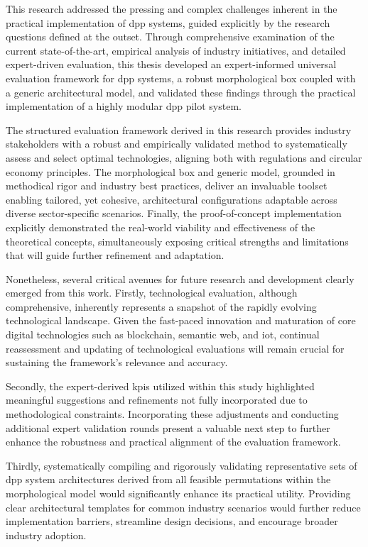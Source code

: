 This research addressed the pressing and complex challenges inherent in the practical implementation of \ac{dpp} systems, guided explicitly by the research questions defined at the outset. Through comprehensive examination of the current state-of-the-art, empirical analysis of industry initiatives, and detailed expert-driven evaluation, this thesis developed an expert-informed universal evaluation framework for \ac{dpp} systems, a robust morphological box coupled with a generic architectural model, and validated these findings through the practical implementation of a highly modular \ac{dpp} pilot system.

The structured evaluation framework derived in this research provides industry stakeholders with a robust and empirically validated method to systematically assess and select optimal technologies, aligning both with regulations and circular economy principles. The morphological box and generic model, grounded in methodical rigor and industry best practices, deliver an invaluable toolset enabling tailored, yet cohesive, architectural configurations adaptable across diverse sector-specific scenarios. Finally, the proof-of-concept implementation explicitly demonstrated the real-world viability and effectiveness of the theoretical concepts, simultaneously exposing critical strengths and limitations that will guide further refinement and adaptation.

Nonetheless, several critical avenues for future research and development clearly emerged from this work. Firstly, technological evaluation, although comprehensive, inherently represents a snapshot of the rapidly evolving technological landscape. Given the fast-paced innovation and maturation of core digital technologies such as blockchain, semantic web, and \ac{iot}, continual reassessment and updating of technological evaluations will remain crucial for sustaining the framework’s relevance and accuracy.

Secondly, the expert-derived \ac{kpi}s utilized within this study highlighted meaningful suggestions and refinements not fully incorporated due to methodological constraints. Incorporating these adjustments and conducting additional expert validation rounds present a valuable next step to further enhance the robustness and practical alignment of the evaluation framework.

Thirdly, systematically compiling and rigorously validating representative sets of \ac{dpp} system architectures derived from all feasible permutations within the morphological model would significantly enhance its practical utility. Providing clear architectural templates for common industry scenarios would further reduce implementation barriers, streamline design decisions, and encourage broader industry adoption.

